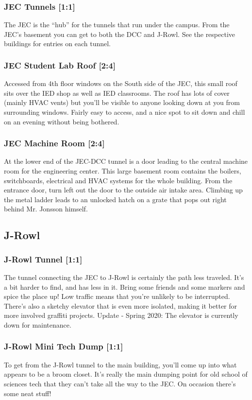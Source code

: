 \documentclass{article}
\begin{document}
\subsubsection{JEC Tunnels [1:1]}
The JEC is the “hub” for the tunnels that run under the campus. From the JEC’s basement you can get to both the DCC and J-Rowl. See the respective buildings for entries on each tunnel.

 \subsubsection{JEC Student Lab Roof [2:4]}
Accessed from 4th floor windows on the South side of the JEC, this small roof sits over the IED shop as well as IED classrooms. The roof has lots of cover (mainly HVAC vents) but you’ll be visible to anyone looking down at you from surrounding windows. Fairly easy to access, and a nice spot to sit down and chill on an evening without being bothered.
\subsubsection{JEC Machine Room [2:4]}
At the lower end of the JEC-DCC tunnel is a door leading to the central machine room for the engineering center. This large basement room contains the boilers, switchboards, electrical and HVAC systems for the whole building. From the entrance door, turn left out the door to the outside air intake area. Climbing up the metal ladder leads to an unlocked hatch on a grate that pops out right behind Mr. Jonsson himself.
\pagebreak
\subsection{J-Rowl}
\subsubsection{J-Rowl Tunnel [1:1]}
The tunnel connecting the JEC to J-Rowl is certainly the path less traveled. It’s a bit harder to find, and has less in it. Bring some friends and some markers and spice the place up! Low traffic means that you’re unlikely to be interrupted. There’s also a sketchy elevator that is even more isolated, making it better for more involved graffiti projects.
Update - Spring 2020: The elevator is currently down for maintenance.
\subsubsection{J-Rowl Mini Tech Dump [1:1]}
To get from the J-Rowl tunnel to the main building, you’ll come up into what appears to be a broom closet. It’s really the main dumping point for old school of sciences tech that they can’t take all the way to the JEC. On occasion there’s some neat stuff!
\end{document}
